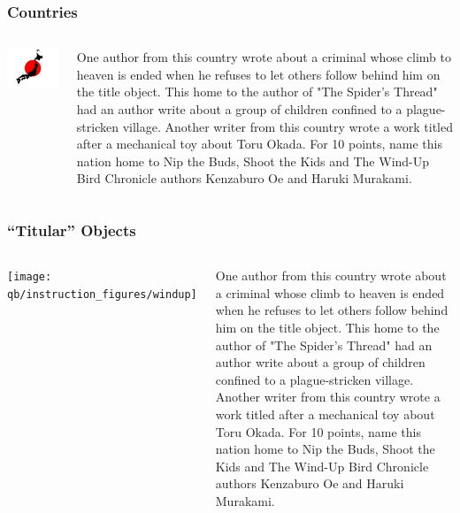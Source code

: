 \documentclass[compress]{beamer}
\begin{document}
\begin{frame}
\frametitle{Countries}


\begin{columns}
  \includegraphics[width=1.0\linewidth]{qb/instruction_figures/japan}


One author from \alert<2>{this country} wrote about a criminal whose climb to heaven is ended when he refuses to let others follow behind him on the title object. \alert<2>{This home to the author of "The Spider's Thread"} had an author write about a group of children confined to a plague-stricken village. Another writer from \alert<2>{this country} wrote a work titled after a mechanical toy about Toru Okada. For 10 points, name \alert<2>{this nation} home to Nip the Buds, Shoot the Kids and The Wind-Up Bird Chronicle authors Kenzaburo Oe and Haruki Murakami.


\end{columns}

\end{frame}


\begin{frame}
\frametitle{``Titular'' Objects}


\begin{columns}
  \texttt{[image: qb/instruction\_figures/windup]}


One author from this country wrote about a criminal whose climb to heaven is ended when he refuses to let others follow behind him on the title object. This home to the author of "The Spider's Thread" had an author write about a group of children confined to a plague-stricken village. Another writer from this country wrote a work titled after \alert<2>{a mechanical toy} about Toru Okada. For 10 points, name this nation home to Nip the Buds, Shoot the Kids and \alert<2>{The Wind-Up Bird} Chronicle authors Kenzaburo Oe and Haruki Murakami.
\end{columns}

\end{frame}
\end{document}
